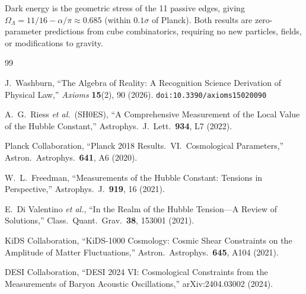 \documentclass[12pt,a4paper]{article}
\theoremstyle{definition}
\theoremstyle{remark}
\begin{document}
Dark energy is the geometric stress of the 11 passive edges,
giving $\Omega_\Lambda = 11/16 - \alpha/\pi \approx 0.685$
(within $0.1\sigma$ of Planck).  Both results are
zero-parameter predictions from cube combinatorics, requiring
no new particles, fields, or modifications to gravity.

\begin{thebibliography}{99}

J.~Washburn, ``The Algebra of Reality: A Recognition Science Derivation
of Physical Law,'' \emph{Axioms} \textbf{15}(2), 90 (2026).
\texttt{doi:10.3390/axioms15020090}

A.~G.~Riess \textit{et al.}\ (SH0ES), ``A Comprehensive
Measurement of the Local Value of the Hubble Constant,''
Astrophys.\ J.\ Lett.\ \textbf{934}, L7 (2022).

Planck Collaboration, ``Planck 2018 Results.\ VI.\
Cosmological Parameters,'' Astron.\ Astrophys.\
\textbf{641}, A6 (2020).

W.~L.~Freedman, ``Measurements of the Hubble Constant:
Tensions in Perspective,'' Astrophys.\ J.\ \textbf{919},
16 (2021).

E.~Di Valentino \textit{et al.}, ``In the Realm of the
Hubble Tension---A Review of Solutions,'' Class.\ Quant.\
Grav.\ \textbf{38}, 153001 (2021).

\bibitem{KiDS2021}
KiDS Collaboration, ``KiDS-1000 Cosmology: Cosmic Shear
Constraints on the Amplitude of Matter Fluctuations,''
Astron.\ Astrophys.\ \textbf{645}, A104 (2021).

\bibitem{DESI2024}
DESI Collaboration, ``DESI 2024 VI: Cosmological
Constraints from the Measurements of Baryon Acoustic
Oscillations,'' arXiv:2404.03002 (2024).

\end{thebibliography}
\end{document}

